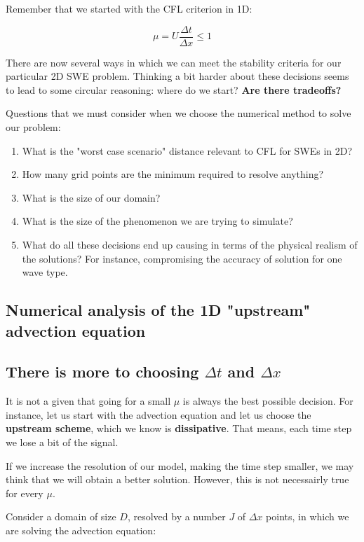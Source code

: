 Remember that we started with the CFL criterion in 1D:

\begin{equation}
	\mu = U \frac {\Delta t}{\Delta x} \le 1
\end{equation}

There are now several ways in which we can meet the stability criteria for our particular 2D SWE problem. Thinking a bit harder about these decisions seems to lead to some circular reasoning: where do we start? \textbf{Are there tradeoffs?} 
\medskip

Questions that we must consider when we choose the numerical method to solve our problem:
\begin{enumerate}
	\item What is the "worst case scenario" distance relevant to CFL for SWEs in 2D?
	\item How many grid points are the minimum required to resolve anything?
	\item What is the size of our domain?
	\item What is the size of the phenomenon we are trying to simulate?
	\item What do all these decisions end up causing in terms of the physical realism of the solutions? For instance, compromising the accuracy of solution for one wave type.
	
\end{enumerate}


\subsection{Numerical analysis of the 1D "upstream" advection equation}
\subsection{There is more to choosing $\Delta t$ and $\Delta x $}

It is not a given that going for a small $\mu$ is always the best possible decision.
For instance, let us start with the advection equation and let us choose the \textbf{upstream scheme}, which we know is \textbf{dissipative}. That means, each time step we lose a bit of the signal.


If we increase the resolution of our model, making the time step smaller, we may think that we will obtain a better solution. However, this is not necessairly true for every $\mu$.

\medskip
Consider a domain of size $D$, resolved by a number $J$ of $\Delta x$ points, in which we are solving the advection equation:

